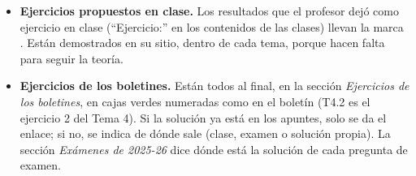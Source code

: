 \begin{itemize}
\begin{itemize}
    \end{itemize}
    Los teoremas y corolarios van destacados en rojo.
    \item \textbf{Ejercicios propuestos en clase.} Los resultados que el profesor dejó como ejercicio en clase (``Ejercicio:'' en los contenidos de las clases) llevan la marca \marcaE. Están demostrados en su sitio, dentro de cada tema, porque hacen falta para seguir la teoría.
    \item \textbf{Ejercicios de los boletines.} Están todos al final, en la sección \emph{Ejercicios de los boletines}, en cajas verdes numeradas como en el boletín (T4.2 es el ejercicio 2 del Tema 4). Si la solución ya está en los apuntes, solo se da el enlace; si no, se indica de dónde sale (clase, examen o solución propia). La sección \emph{Exámenes de 2025-26} dice dónde está la solución de cada pregunta de examen.
\end{itemize}
